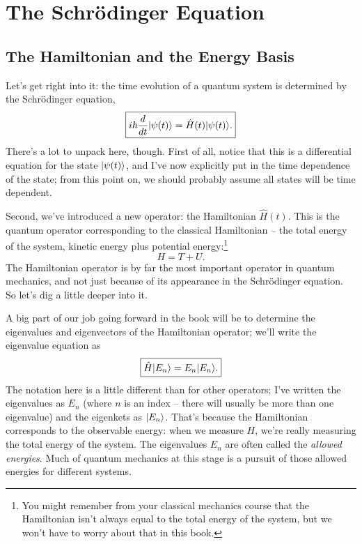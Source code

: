 \chapter{The Schr\"odinger Equation}

\section{The Hamiltonian and the Energy Basis}
\label{sec_ham_and_energy}

Let's get right into it: the time evolution of a quantum system is determined by the Schr\"odinger equation,
\begin{equation}
\label{eq_schrodinger}
\boxed{
i\hbar \frac{d}{dt} | \psi (t) \rangle = \hat{H}(t) | \psi (t) \rangle.
}
\end{equation}
There's a lot to unpack here, though.  First of all, notice that this is a differential equation for the state $| \psi (t) \rangle$, and I've now explicitly put in the time dependence of the state; from this point on, we should probably assume all states will be time dependent.  

Second, we've introduced a new operator:  the Hamiltonian $\hat{H}(t)$.  This is the quantum operator corresponding to the classical Hamiltonian -- the total energy of the system, kinetic energy plus potential energy:\footnote{You might remember from your classical mechanics course that the Hamiltonian isn't always equal to the total energy of the system, but we won't have to worry about that in this book.}
\begin{equation}
H = T + U.
\end{equation}
The Hamiltonian operator is by far the most important operator in quantum mechanics, and not just because of its appearance in the Schr\"odinger equation.  So let's dig a little deeper into it.

A big part of our job going forward in the book will be to determine the eigenvalues and eigenvectors of the Hamiltonian operator; we'll write the eigenvalue equation as
\begin{equation}
\label{eq_eee}
\boxed{
\hat{H} | E_n \rangle = E_n | E_n \rangle.
}
\end{equation}
The notation here is a little different than for other operators; I've written the eigenvalues as $E_n$ (where $n$ is an index -- there will usually be more than one eigenvalue) and the eigenkets as $| E_n \rangle$.  That's because the Hamiltonian corresponds to the observable energy:  when we measure $H$, we're really measuring the total energy of the system.  The eigenvalues $E_n$ are often called the \emph{allowed energies}.  Much of quantum mechanics at this stage is a pursuit of those allowed energies for different systems.

